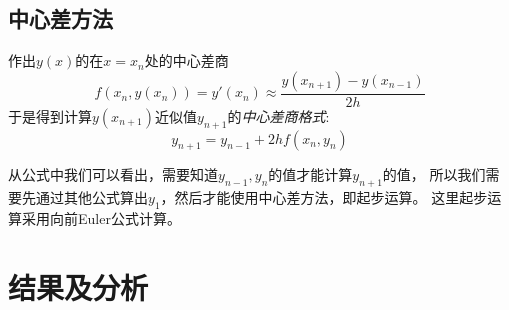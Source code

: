 \documentclass{article}
\begin{document}
\subsection{中心差方法}

作出$y(x)$的在$x=x_n$处的中心差商
\[f(x_n, y(x_n)) = y'(x_n) \approx \frac{y(x_{n+1}) - y(x_{n-1})}{2h}\]
于是得到计算$y(x_{n+1})$近似值$y_{n+1}$的\emph{中心差商格式}:
\[y_{n+1} = y_{n-1} + 2hf(x_n, y_n)\]

从公式中我们可以看出，需要知道$y_{n-1}, y_n$的值才能计算$y_{n+1}$的值，
所以我们需要先通过其他公式算出$y_1$，然后才能使用中心差方法，即起步运算。
这里起步运算采用向前Euler公式计算。

\section{结果及分析} \label{result_analyse}
\end{document}
